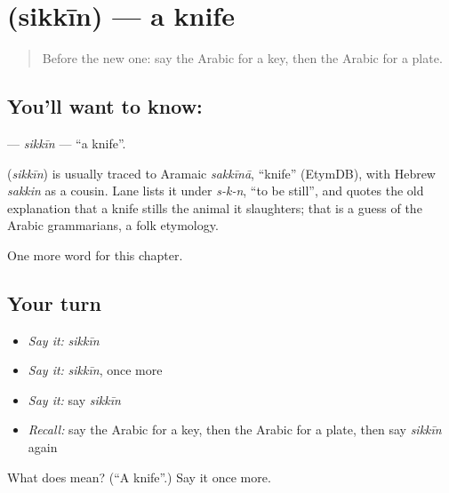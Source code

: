 \section[\texorpdfstring{\ar{سكين} (sikkīn)}{سكين (sikkīn)}]{ (sikkīn) — a knife}

\label{lesson:AR-C71-sikkin}



\begin{quote}
Before the new one: say the Arabic for a key, then the Arabic for a plate.
\end{quote}

\subsection*{You'll want to know: }
\textbf{} — \emph{sikkīn} — \textquotedblleft{}a knife\textquotedblright{}.

\begin{cousinweb}
\textbf{} (\emph{sikkīn}) is usually traced to Aramaic \emph{sakkīnā}, \textquotedblleft{}knife\textquotedblright{} (EtymDB), with Hebrew \emph{sakkin} as a cousin. Lane lists it under \emph{s-k-n}, \textquotedblleft{}to be still\textquotedblright{}, and quotes the old explanation that a knife stills the animal it slaughters; that is a guess of the Arabic grammarians, a folk etymology.
\end{cousinweb}

\begin{grammarlens}[title={What you've built}]
One more word for this chapter.
\end{grammarlens}

\subsection*{Your turn}
\begin{itemize}
\raggedright
  \item \emph{Say it:} \emph{sikkīn}
  \item \emph{Say it:} \emph{sikkīn}, once more
  \item \emph{Say it:} say \emph{sikkīn}
  \item \emph{Recall:} say the Arabic for a key, then the Arabic for a plate, then say \emph{sikkīn} again
\end{itemize}

\begin{tcolorbox}[breakable,colback=teal!4,colframe=teal!35!black,title={Before you move on}]
What does  mean? (\textquotedblleft{}A knife\textquotedblright{}.) Say it once more.
\end{tcolorbox}
